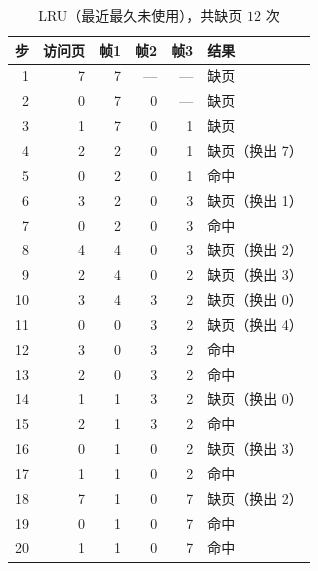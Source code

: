 \begin{table}[H]
\centering
\caption{LRU（最近最久未使用），共缺页 $12$ 次}
\begin{tabular}{rrrrrl}
\toprule
步 & 访问页 & 帧1 & 帧2 & 帧3 & 结果 \\
\midrule
 1 & 7 & 7 & — & — & 缺页 \\
 2 & 0 & 7 & 0 & — & 缺页 \\
 3 & 1 & 7 & 0 & 1 & 缺页 \\
 4 & 2 & 2 & 0 & 1 & 缺页（换出 7） \\
 5 & 0 & 2 & 0 & 1 & 命中 \\
 6 & 3 & 2 & 0 & 3 & 缺页（换出 1） \\
 7 & 0 & 2 & 0 & 3 & 命中 \\
 8 & 4 & 4 & 0 & 3 & 缺页（换出 2） \\
 9 & 2 & 4 & 0 & 2 & 缺页（换出 3） \\
10 & 3 & 4 & 3 & 2 & 缺页（换出 0） \\
11 & 0 & 0 & 3 & 2 & 缺页（换出 4） \\
12 & 3 & 0 & 3 & 2 & 命中 \\
13 & 2 & 0 & 3 & 2 & 命中 \\
14 & 1 & 1 & 3 & 2 & 缺页（换出 0） \\
15 & 2 & 1 & 3 & 2 & 命中 \\
16 & 0 & 1 & 0 & 2 & 缺页（换出 3） \\
17 & 1 & 1 & 0 & 2 & 命中 \\
18 & 7 & 1 & 0 & 7 & 缺页（换出 2） \\
19 & 0 & 1 & 0 & 7 & 命中 \\
20 & 1 & 1 & 0 & 7 & 命中 \\
\bottomrule
\end{tabular}
\end{table}

